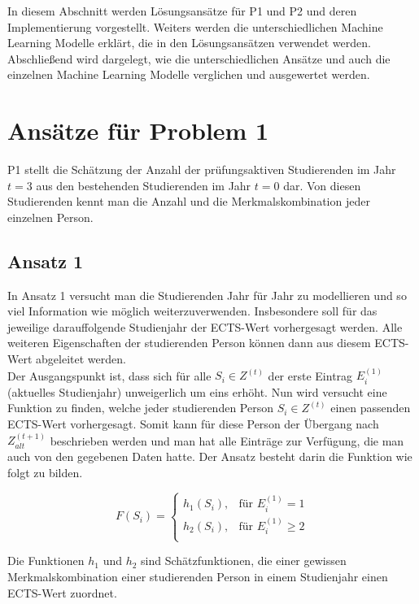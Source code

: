 

In diesem Abschnitt werden L\"osungsans\"atze f\"ur P1 und P2 und deren Implementierung vorgestellt. 
Weiters werden die unterschiedlichen Machine Learning Modelle erkl\"art, die in den L\"osungsans\"atzen verwendet werden.
Abschlie{\ss}end wird dargelegt, wie die unterschiedlichen Ans\"atze und auch die einzelnen Machine Learning Modelle
verglichen und ausgewertet werden. 

\section{Ans\"atze f\"ur Problem 1}
P1 stellt die Sch\"atzung der Anzahl der pr\"ufungsaktiven Studierenden im Jahr $t = 3$ aus den bestehenden Studierenden im Jahr $t = 0$ dar. 
Von diesen Studierenden kennt man die Anzahl und die Merkmalskombination jeder einzelnen Person.

\subsection{Ansatz 1}
\label{sec:appr1}
In Ansatz 1 versucht man die Studierenden Jahr f\"ur Jahr zu modellieren und so viel Information wie m\"oglich weiterzuverwenden. 
Insbesondere soll f\"ur das jeweilige darauffolgende Studienjahr der ECTS-Wert vorhergesagt werden. Alle weiteren Eigenschaften der studierenden Person 
k\"onnen dann aus diesem ECTS-Wert abgeleitet werden. \\

Der Ausgangspunkt ist, dass sich für alle $S_i \in Z^{(t)}$ der erste Eintrag $E_i^{(1)}$ (aktuelles Studienjahr) unweigerlich um eins erhöht. 
Nun wird versucht eine Funktion zu finden, welche jeder studierenden Person $S_i \in Z^{(t)}$ einen passenden ECTS-Wert vorhergesagt. 
Somit kann f\"ur diese Person der \"Ubergang nach $Z_{alt}^{(t+1)}$ beschrieben werden und man hat alle Eintr\"age zur Verf\"ugung, die 
man auch von den gegebenen Daten hatte. Der Ansatz besteht darin die Funktion wie folgt zu bilden.
    
  $$
    F(S_i)=
    \left\{
    \begin{array}{lr}
      h_1(S_i),& \text{für }E_i^{(1)} = 1 \\
      h_2(S_i),& \text{für }E_i^{(1)} \geq 2 \\ 
    \end{array}
    \right.
  $$

Die Funktionen $h_1$ und $h_2$ sind Sch\"atzfunktionen, die einer gewissen Merkmalskombination einer studierenden Person in einem Studienjahr einen 
ECTS-Wert zuordnet. \\

